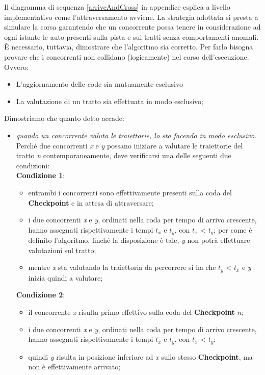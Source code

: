 Il diagramma di sequenza \ref{arriveAndCross} in appendice esplica a livello implementativo come l'attraversamento avviene.
La strategia adottata si presta a simulare la corsa garantendo che un concorrente possa tenere in considerazione ad
ogni istante le auto presenti sulla pista e sui tratti senza comportamenti
anomali. \`{E} necessario, tuttavia, dimostrare che l'algoritmo sia corretto. Per farlo bisogna provare che i concorrenti
non collidano (logicamente) nel corso dell'esecuzione. Ovvero:
\begin{itemize}
\item L'aggiornamento delle code sia mutuamente esclusivo
\item La valutazione di un tratto sia effettuata in modo esclusivo;
\end{itemize}
Dimostriamo che quanto detto accade:
\begin{itemize}
\item \emph{quando un concorrente valuta le traiettorie, lo sta facendo in modo
esclusivo}.
Perché due concorrenti \emph{x} e \emph{y} possano iniziare a valutare le traiettorie del tratto \emph{n}
contemporaneamente, deve verificarsi una delle seguenti due condizioni:\\
\textbf{Condizione 1}:
\begin{itemize}
\item entrambi i concorrenti sono effettivamente presenti sulla coda del \textbf{Checkpoint} e in attesa di attraversare;
\item i due concorrenti \emph{x} e \emph{y}, ordinati nella coda per tempo di arrivo crescente, hanno assegnati rispettivamente i tempi
\emph{$t_x$} e \emph{$t_y$}, con $t_x$ < $t_y$; per come è definito l'algoritmo, finché la disposizione è tale, \emph{y} non potrà effettuare
valutazioni sul tratto;
\item mentre \emph{x} sta valutando la traiettoria da percorrere
si ha che $t_y$ < $t_x$ e \emph{y} inizia quindi a valutare;
\end{itemize}
\textbf{Condizione 2}:
\begin{itemize}
\item il concorrente \emph{x} risulta primo effettivo sulla coda del \textbf{Checkpoint} \emph{n}; 
\item i due concorrenti \emph{x} e \emph{y}, ordinati nella coda per tempo di arrivo crescente, hanno assegnati rispettivamente i tempi
\emph{$t_x$} e \emph{$t_y$}, con $t_x$ < $t_y$; 
\item quindi \emph{y} risulta in posizione inferiore ad \emph{x} sullo stesso \textbf{Checkpoint}, ma non è effettivamente arrivato;

\end{itemize}
\end{itemize}
